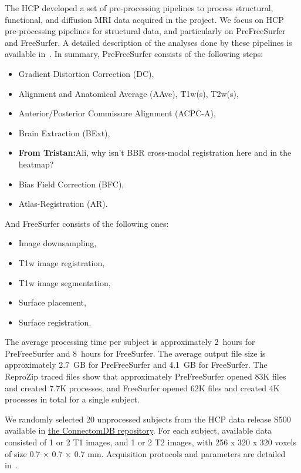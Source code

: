 \documentclass[a4paper,num-refs]{oup-contemporary}
\newcommand{\reprozip}[0]{ReproZip\xspace}
\newcommand{\tristan}[1]{\color{blue}\textbf{From Tristan:}#1\color{black}}
\begin{document}
The HCP developed a set of pre-processing pipelines to process structural,
functional, and diffusion MRI data acquired in the project. We focus on HCP
pre-processing pipelines for structural data, and particularly
on PreFreeSurfer and FreeSurfer. 
A detailed description of the analyses done by these
pipelines is available in~\cite{glasser2013}. 
In summary, PreFreeSurfer consists of the following steps: 
\begin{itemize}
\item Gradient Distortion Correction (DC), 
\item Alignment and Anatomical Average (AAve), T1w(s), T2w(s),  
\item Anterior/Posterior Commissure Alignment (ACPC-A), 
\item Brain Extraction (BExt), 
\item \tristan{Ali, why isn't BBR cross-modal registration here and in the heatmap?}
\item Bias Field Correction (BFC), 
\item Atlas-Registration (AR).
\end{itemize}
And FreeSurfer consists of the following ones:
\begin{itemize}
\item Image downsampling, 
\item T1w image registration, 
\item T1w image segmentation,
\item Surface placement, 
\item Surface registration.
\end{itemize}
The average processing time per subject is approximately 2~hours for
PreFreeSurfer and 8~hours for FreeSurfer. The average output file size is
approximately 2.7~GB for PreFreeSurfer and 4.1~GB for FreeSurfer.
The \reprozip traced files show that approximately PreFreeSurfer opened  
83K files and created 7.7K processes, and FreeSurfer opened 62K files and 
created 4K processes in total for a single subject.

We randomly selected 20 unprocessed subjects 
from the HCP data release S500 
available in \href{https://db.humanconnectome.org}{the ConnectomDB repository}. 
For each subject, available data consisted of 1 or 2 T1 images, and 1 or 2 T2 images, with 
256 x 320 x 320 voxels of size 0.7 × 0.7 × 0.7 mm.
Acquisition protocols and parameters are detailed in~\cite{van2013wu}. 
\end{document}
